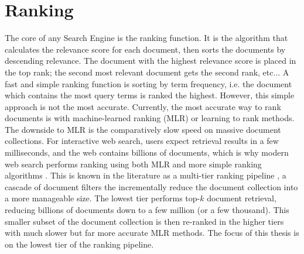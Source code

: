 \section{Ranking}
The core of any Search Engine is the ranking function. It is the algorithm that calculates the relevance score for each document, then sorts the documents by descending relevance. The document with the highest relevance score is placed in the top rank; the second most relevant document gets the second rank, etc... A fast and simple ranking function is sorting by term frequency, i.e. the document which contains the most query terms is ranked the highest. However, this simple approach is not the most accurate. Currently, the most accurate way to rank documents is with machine-learned ranking (MLR) or learning to rank methods. The downside to MLR is the comparatively slow speed on massive document collections. For interactive web search, users expect retrieval results in a few milliseconds, and the web contains billions of documents, which is why modern web search performs ranking using both MLR and more simple ranking algorithms \cite{baeza1999modern}. This is known in the literature as a multi-tier ranking pipeline \cite{risvik2003multi}, a cascade of document filters the incrementally reduce the document collection into a more manageable size. The lowest tier performs top-$k$ document retrieval, reducing billions of documents down to a few million (or a few thousand). This smaller subset of the document collection is then re-ranked in the higher tiers with much slower but far more accurate MLR methods. The focus of this thesis is on the lowest tier of the ranking pipeline.






